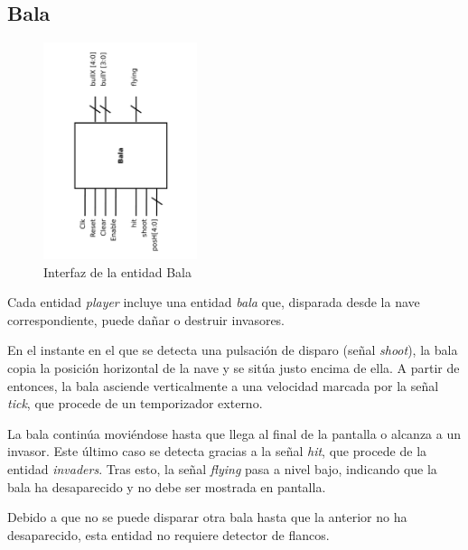 \subsection{Bala}
\label{bullet}

\begin{figure}[H]
	\centering
	\includegraphics[width=0.4\textwidth, angle=-90] {bullet_block.pdf}
	\caption{Interfaz de la entidad Bala}\label{fig:bullet_block}
\end{figure}

Cada entidad \emph{player} incluye una entidad \emph{bala} que, disparada desde la nave correspondiente, puede dañar o destruir invasores.

En el instante en el que se detecta una pulsación de disparo (señal \emph{shoot}), la bala copia la posición horizontal de la nave y se sitúa justo encima de ella. A partir de entonces, la bala asciende verticalmente a una velocidad marcada por la señal \emph{tick}, que procede de un temporizador externo.

La bala continúa moviéndose hasta que llega al final de la pantalla o alcanza a un invasor. Este último caso se detecta gracias a la señal \emph{hit}, que procede de la entidad \emph{invaders}. Tras esto, la señal \emph{flying} pasa a nivel bajo, indicando que la bala ha desaparecido y no debe ser mostrada en pantalla.

Debido a que no se puede disparar otra bala hasta que la anterior no ha desaparecido, esta entidad no requiere detector de flancos.